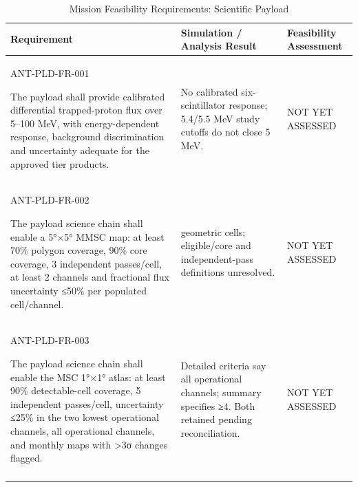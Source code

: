 \begin{table}[H]\centering\small\setlength{\tabcolsep}{3pt}
\caption{Mission Feasibility Requirements: Scientific Payload}\label{tab:fr-pld}
\begin{tabular}{@{}
>{\RaggedRight\arraybackslash}p{}
>{\RaggedRight\arraybackslash}p{}
>{\RaggedRight\arraybackslash}p{}
@{}}
\toprule Requirement & Simulation / Analysis Result & Feasibility Assessment\\\midrule
{}\label{req:ANT-PLD-FR-001}\mbox{ANT-PLD-}\newline\mbox{FR-001}\par The payload shall provide calibrated differential trapped-proton flux over 5–100 MeV, with energy-dependent response, background discrimination and uncertainty adequate for the approved tier products. & No calibrated six-scintillator response; 5.4/5.5 MeV study cutoffs do not close 5 MeV. & NOT YET ASSESSED\\
\addlinespace[3pt]
\label{req:ANT-PLD-FR-002}\mbox{ANT-PLD-}\newline\mbox{FR-002}\par The payload science chain shall enable a 5°×5° MMSC map: at least 70\% polygon coverage, 90\% core coverage, 3 independent passes/cell, at least 2 channels and fractional flux uncertainty ≤50\% per populated cell/channel. & 92 geometric cells; eligible/core and independent-pass definitions unresolved. & NOT YET ASSESSED\\
\addlinespace[3pt]
\label{req:ANT-PLD-FR-003}\mbox{ANT-PLD-}\newline\mbox{FR-003}\par The payload science chain shall enable the MSC 1°×1° atlas: at least 90\% detectable-cell coverage, 5 independent passes/cell, uncertainty ≤25\% in the two lowest operational channels, all operational channels, and monthly maps with >3σ changes flagged. & Detailed criteria say all operational channels; summary specifies ≥4. Both retained pending reconciliation. & NOT YET ASSESSED\\
\addlinespace[3pt]
\bottomrule
\end{tabular}
\end{table}
